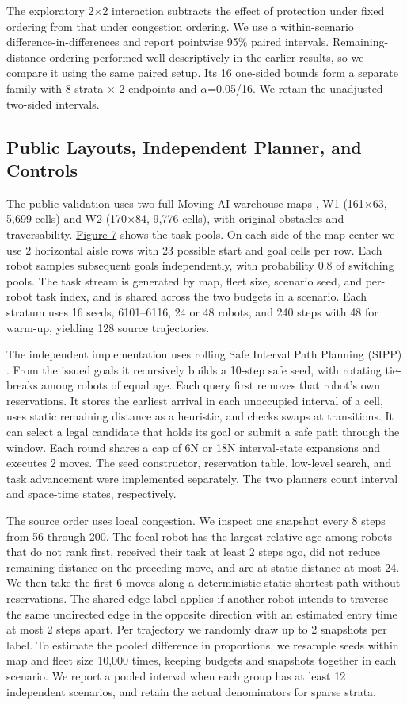 \documentclass{article}
\begin{document}
The exploratory 2\ensuremath{\times}2 interaction subtracts the effect of protection under fixed ordering from that under congestion ordering. We use a within-scenario difference-in-differences and report pointwise 95\% paired intervals. Remaining-distance ordering performed well descriptively in the earlier results, so we compare it using the same paired setup. Its 16 one-sided bounds form a separate family with 8 strata \ensuremath{\times} 2 endpoints and \ensuremath{\alpha}=0.05/16. We retain the unadjusted two-sided intervals.

\subsection{Public Layouts, Independent Planner, and Controls}
The public validation uses two full Moving AI warehouse maps \citep{movingai}, W1 (161\ensuremath{\times}63, 5,699 cells) and W2 (170\ensuremath{\times}84, 9,776 cells), with original obstacles and traversability. \hyperlink{display:Figure7}{Figure 7} shows the task pools. On each side of the map center we use 2 horizontal aisle rows with 23 possible start and goal cells per row. Each robot samples subsequent goals independently, with probability 0.8 of switching pools. The task stream is generated by map, fleet size, scenario seed, and per-robot task index, and is shared across the two budgets in a scenario. Each stratum uses 16 seeds, 6101--6116, 24 or 48 robots, and 240 steps with 48 for warm-up, yielding 128 source trajectories.

The independent implementation uses rolling Safe Interval Path Planning (SIPP) \citep{phillips2011}. From the issued goals it recursively builds a 10-step safe seed, with rotating tie-breaks among robots of equal age. Each query first removes that robot's own reservations. It stores the earliest arrival in each unoccupied interval of a cell, uses static remaining distance as a heuristic, and checks swaps at transitions. It can select a legal candidate that holds its goal or submit a safe path through the window. Each round shares a cap of 6N or 18N interval-state expansions and executes 2 moves. The seed constructor, reservation table, low-level search, and task advancement were implemented separately. The two planners count interval and space-time states, respectively.

The source order uses local congestion. We inspect one snapshot every 8 steps from 56 through 200. The focal robot has the largest relative age among robots that do not rank first, received their task at least 2 steps ago, did not reduce remaining distance on the preceding move, and are at static distance at most 24. We then take the first 6 moves along a deterministic static shortest path without reservations. The shared-edge label applies if another robot intends to traverse the same undirected edge in the opposite direction with an estimated entry time at most 2 steps apart. Per trajectory we randomly draw up to 2 snapshots per label. To estimate the pooled difference in proportions, we resample seeds within map and fleet size 10,000 times, keeping budgets and snapshots together in each scenario. We report a pooled interval when each group has at least 12 independent scenarios, and retain the actual denominators for sparse strata.
\end{document}
